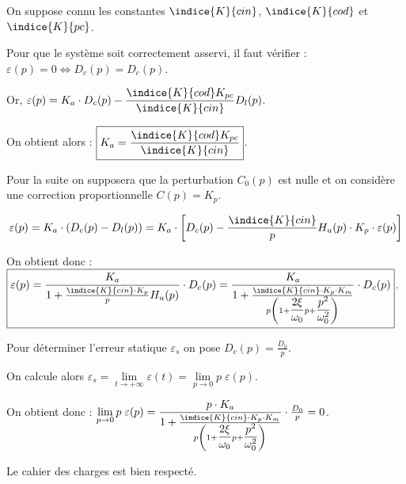 On suppose connu les constantes $\indice{K}{cin}$, $\indice{K}{cod}$ et $\indice{K}{pc}$.

\ifprof
\begin{corrige}
Pour que le système soit correctement asservi, il faut vérifier : 
$\varepsilon(p)=0\Leftrightarrow D_c(p)=D_c(p)$.

Or, $\varepsilon(p)=K_a\cdot D_c(p)-\dfrac{\indice{K}{cod}K_{pc}}{\indice{K}{cin}}D_l(p)$.

On obtient alors : 
$
\boxed{
K_a=\dfrac{\indice{K}{cod}K_{pc}}{\indice{K}{cin}}
}
$.

\end{corrige}
\else
\fi

Pour la suite on supposera que la perturbation $C_0(p)$ est nulle et on considère une correction proportionnelle $C(p)=K_p$.

\ifprof
\begin{corrige}
\begin{align*}
\varepsilon(p)=K_a\cdot \left(D_c(p)-D_l(p)\right)=K_a\cdot \left[D_c(p)-\frac{\indice{K}{cin}}{p}H_u(p)\cdot K_p\cdot \varepsilon(p)\right]
\end{align*}

On obtient donc : 
$
\boxed{
\varepsilon(p)=\dfrac{K_a}{1+\frac{\indice{K}{cin}\cdot K_p}{p}H_u(p)}\cdot D_c(p)=\dfrac{K_a}{1+\frac{\indice{K}{cin}\cdot K_p\cdot K_m}{p\left(1+\dfrac{2\xi}{\omega_0}p+\dfrac{p^2}{\omega_0^2}\right)}}\cdot D_c(p)
}
$.

\end{corrige}
\else
\fi

\ifprof
\begin{corrige}
Pour déterminer l'erreur statique $\varepsilon_s$ on pose $D_c(p)=\frac{D_0}{p}$.

On calcule alors $\varepsilon_s=\lim\limits_{t\rightarrow+\infty} \varepsilon(t) = \lim\limits_{p\rightarrow0} p\;\varepsilon(p).$

On obtient donc : 
$
\lim\limits_{p\rightarrow0} p\;\varepsilon(p)=\dfrac{p\cdot K_a}{1+\frac{\indice{K}{cin}\cdot K_p\cdot K_m}{p\left(1+\dfrac{2\xi}{\omega_0}p+\dfrac{p^2}{\omega_0^2}\right)}}\cdot\frac{D_0}{p}=0
$.

Le cahier des charges est bien respecté.
\end{corrige}
\else
\fi

